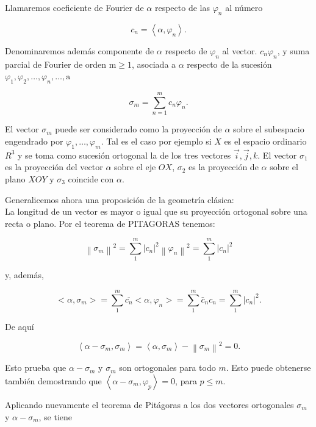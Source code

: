 \documentclass[10pt]{article}
\theoremstyle{plain}
\theoremstyle{definition}
\theoremstyle{remark}
\begin{document}
Llamaremos coeficiente de Fourier de $\alpha$ respecto de las $\varphi_{n}$ al número


\begin{equation*}
c_{n}=\left\langle\alpha, \varphi_{n}\right\rangle . \tag{$4\cdot1$}
\end{equation*}


Denominaremos además componente de $\alpha$ respecto de $\varphi_{n}$ al vector. $c_{n} \varphi_{n}$, y suma parcial de Fourier de orden $\mathrm{m} \geqslant 1$, asociada a $\alpha$ respecto de la sucesión $\varphi_{1}, \varphi_{2}, \ldots, \varphi_{n}, \ldots, \mathrm{a}$

$$
\sigma_{m}=\sum_{n=1}^{m} c_{n} \varphi_{n} .
$$

El vector $\sigma_{m}$ puede ser considerado como la proyección de $\alpha$ sobre el subespacio engendrado por $\varphi_{1}, \ldots, \varphi_{m}$. Tal es el caso por ejemplo si $X$ es el espacio ordinario $R^{3}$ y se toma como sucesión ortogonal la de los tres vectores $\vec{i}, \vec{j}, k$. El vector $\sigma_{1}$ es la proyección del vector $\alpha$ sobre el eje $O X$, $\sigma_{2}$ es la proyección de $\alpha$ sobre el plano $X O Y$ y $\sigma_{3}$ coincide con $\alpha$.

Generalicemos ahora una proposición de la geometría clásica:\\
La longitud de un vector es mayor o igual que su proyección ortogonal sobre una recta o plano. Por el teorema de PITAGORAS tenemos:

$$
\left\|\sigma_{m}\right\|^{2}=\sum_{1}^{m}\left|c_{n}\right|^{2}\left\|\varphi_{n}\right\|^{2}=\sum_{1}^{m}\left|c_{n}\right|^{2}
$$

y, además,

$$
<\alpha, \sigma_{m}>=\sum_{1}^{m} \overline{c_{n}}<\alpha, \varphi_{n}>=\sum_{1}^{m} \bar{c}_{n} c_{n}=\sum_{1}^{m}\left|c_{n}\right|^{2} .
$$

De aquí

$$
\left\langle\alpha-\sigma_{m}, \sigma_{m}\right\rangle=\left\langle\alpha, \sigma_{m}\right\rangle-\left\|\sigma_{m}\right\|^{2}=0 .
$$

Esto prueba que $\alpha-\sigma_{m}$ y $\sigma_{m}$ son ortogonales para todo $m$. Esto puede obtenerse también demostrando que $\left\langle\alpha-\sigma_{m}, \varphi_{p}\right\rangle=0$, para $p \leqslant m$.

Aplicando nuevamente el teorema de Pitágoras a los dos vectores ortogonales $\sigma_{m}$ y $\alpha-\sigma_{m}$, se tiene
\end{document}

